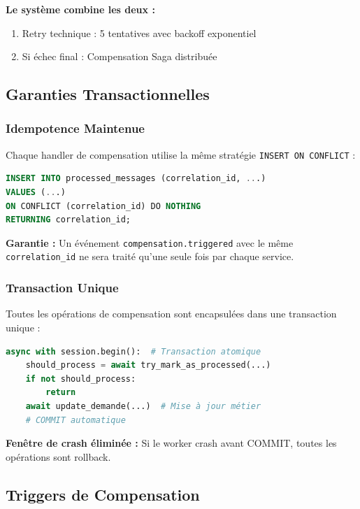 \documentclass[12pt,a4paper]{article}
\begin{document}
\textbf{Le système combine les deux :}

\begin{enumerate}
    \item Retry technique : 5 tentatives avec backoff exponentiel
    \item Si échec final : Compensation Saga distribuée
\end{enumerate}

\subsection{Garanties Transactionnelles}

\subsubsection{Idempotence Maintenue}

Chaque handler de compensation utilise la même stratégie \texttt{INSERT ON CONFLICT} :

\begin{lstlisting}[language=SQL]
INSERT INTO processed_messages (correlation_id, ...)
VALUES (...)
ON CONFLICT (correlation_id) DO NOTHING
RETURNING correlation_id;
\end{lstlisting}

\textbf{Garantie :} Un événement \texttt{compensation.triggered} avec le même \texttt{correlation\_id} ne sera traité qu'une seule fois par chaque service.

\subsubsection{Transaction Unique}

Toutes les opérations de compensation sont encapsulées dans une transaction unique :

\begin{lstlisting}[language=Python]
async with session.begin():  # Transaction atomique
    should_process = await try_mark_as_processed(...)
    if not should_process:
        return
    await update_demande(...)  # Mise à jour métier
    # COMMIT automatique
\end{lstlisting}

\textbf{Fenêtre de crash éliminée :} Si le worker crash avant COMMIT, toutes les opérations sont rollback.

\subsection{Triggers de Compensation}
\end{document}
